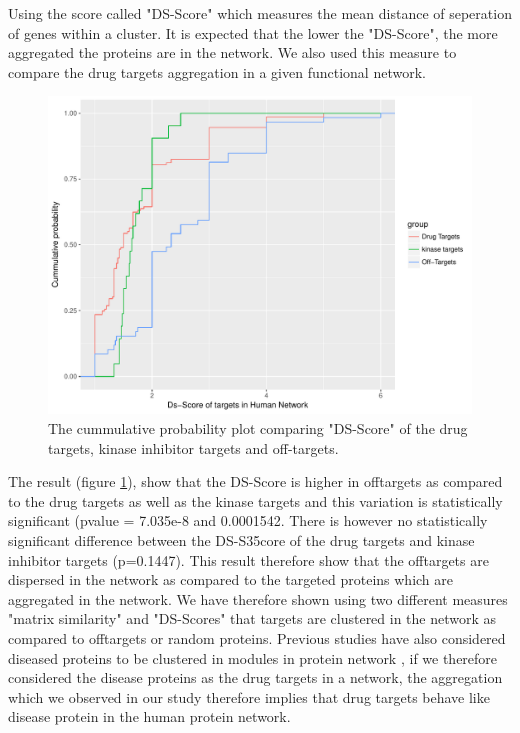 \documentclass[a4paper, 11pt]{article}
\begin{document}
Using the \cite{menche2015uncovering} score called "DS-Score" which measures the mean distance of seperation of genes within a cluster. It is expected that the lower the "DS-Score", the more aggregated the proteins are in the network. We also used this measure to compare the drug targets aggregation in a given functional network.
\begin{figure}[H]
	\includegraphics[width=\linewidth]{figures/ds_plot0610.pdf}
	\centering
	\caption{The cummulative probability plot comparing "DS-Score" of the drug targets, kinase inhibitor targets and off-targets.}
		\label{ds_targets}
\end{figure}
The result (figure \ref{ds_targets}), show that the DS-Score is higher in offtargets as compared to the drug targets as well as the kinase targets and this variation is statistically significant (pvalue = 7.035e-8 and 0.0001542. There is however no statistically significant difference between the DS-S35core of the drug targets and kinase inhibitor targets (p=0.1447). This result therefore show that the offtargets are dispersed in the network as compared to the targeted proteins which are aggregated in the network. We have therefore shown using two different measures "matrix similarity" and "DS-Scores" that targets are clustered in the network as compared to offtargets or random proteins. Previous studies have also considered diseased proteins to be clustered in modules in protein network \cite{menche2015uncovering}, if we therefore considered the disease proteins as the drug targets in a network, the aggregation which we observed in our study therefore implies that drug targets behave like disease protein in the human protein network. 
                                         
\end{document}
